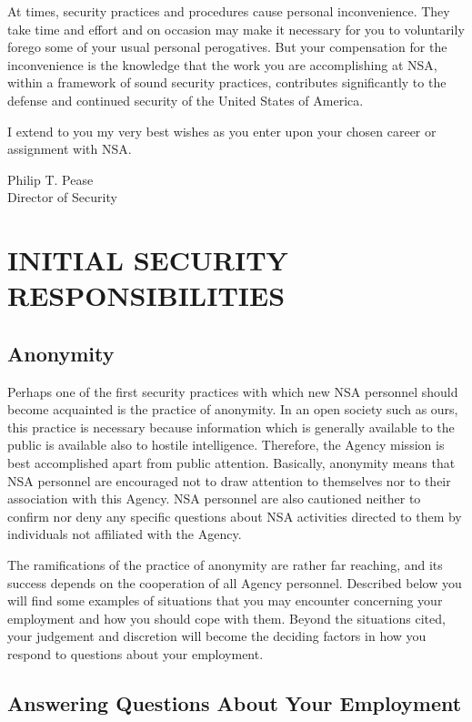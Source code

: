 \documentclass[a4]{article}
\begin{document}
At times, security practices and procedures cause personal inconvenience.  They
take time and effort and on occasion may make it necessary for you to
voluntarily forego some of your usual personal perogatives.  But your
compensation for the inconvenience is the knowledge that the work you are
accomplishing at NSA, within a framework of sound security practices,
contributes significantly to the defense and continued security of the United
States of America.

I extend to you my very best wishes as you enter upon your chosen career or
assignment with NSA.

\noindent Philip T. Pease\\
Director of Security


\section{INITIAL SECURITY RESPONSIBILITIES}

\subsection{Anonymity}

Perhaps one of the first security practices with which new NSA personnel
should become acquainted is the practice of anonymity.  In an open society
such as ours, this practice is necessary because information which is
generally available to the public is available also to hostile intelligence.
Therefore, the Agency mission is best accomplished apart from public
attention.  Basically, anonymity means that NSA personnel are encouraged not
to draw attention to themselves nor to their association with this Agency.
NSA personnel are also cautioned neither to confirm nor deny any specific
questions about NSA activities directed to them by individuals not affiliated
with the Agency.

The ramifications of the practice of anonymity are rather far reaching, and
its success depends on the cooperation of all Agency personnel.  Described
below you will find some examples of situations that you may encounter
concerning your employment and how you should cope with them.  Beyond the
situations cited, your judgement and discretion will become the deciding
factors in how you respond to questions about your employment.

\subsection{Answering Questions About Your Employment}
\end{document}
